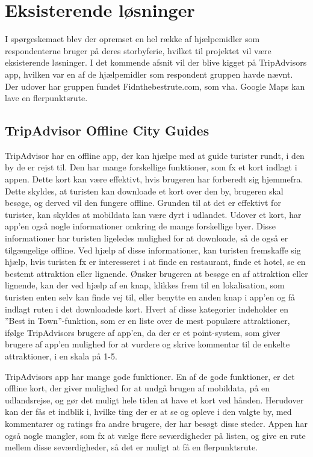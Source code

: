 \section{Eksisterende løsninger}
I spørgeskemaet blev der opremset en hel række af hjælpemidler som respondenterne bruger på deres storbyferie, hvilket til projektet vil være eksisterende løsninger. I det kommende afsnit vil der blive kigget på TripAdvisors app, hvilken var en af de hjælpemidler som respondent gruppen havde nævnt. Der udover har gruppen fundet Fidnthebestrute.com, som vha. Google Maps kan lave en flerpunktsrute.  

\subsection{TripAdvisor Offline City Guides}
TripAdvisor har en offline app, der kan hjælpe med at guide turister rundt, i den by de er rejst til. Den har mange forskellige funktioner, som fx et kort indlagt i appen. Dette kort kan være effektivt, hvis brugeren har forberedt sig hjemmefra. Dette skyldes, at turisten kan downloade et kort over den by, brugeren skal besøge, og derved vil den fungere offline. Grunden til at det er effektivt for turister, kan skyldes at mobildata kan være dyrt i udlandet\citep {TDC}. \newline
Udover et kort, har app'en også nogle informationer omkring de mange forskellige byer. Disse informationer har turisten ligeledes mulighed for at downloade, så de også er tilgængelige offline. Ved hjælp af disse informationer, kan turisten fremskaffe sig hjælp, hvis turisten fx er interesseret i at finde en restaurant, finde et hotel, se en bestemt attraktion eller lignende. Ønsker brugeren at besøge en af attraktion eller lignende, kan der ved hjælp af en knap, klikkes frem til en lokalisation, som turisten enten selv kan finde vej til, eller benytte en anden knap i app'en og få indlagt ruten i det downloadede kort.\newline
Hvert af disse kategorier indeholder en ”Best in Town”-funktion, som er en liste over de mest populære attraktioner, ifølge TripAdvisors brugere af app'en, da der er et point-system, som giver brugere af app'en mulighed for at vurdere og skrive kommentar til de enkelte attraktioner, i en skala på 1-5. \newline

TripAdvisors app har mange gode funktioner. En af de gode funktioner, er det offline kort, der giver mulighed for at undgå brugen af mobildata, på en udlandsrejse, og gør det muligt hele tiden at have et kort ved hånden. Herudover kan der fås et indblik i, hvilke ting der er at se og opleve i den valgte by, med kommentarer og ratings fra andre brugere, der har besøgt disse steder.
Appen har også nogle mangler, som fx at vælge flere seværdigheder på listen, og give en rute mellem disse seværdigheder, så det er muligt at få en flerpunktsrute. \newline
